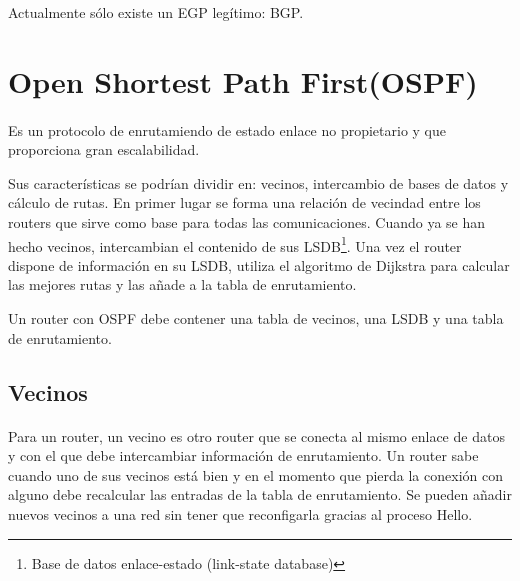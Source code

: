 \documentclass[a4paper,11pt]{article}
\begin{document}
Actualmente sólo existe un EGP legítimo: BGP.


\section{Open Shortest Path First(OSPF)}\label{sec:ospf}
\paragraph{  }
Es un protocolo de enrutamiendo de estado enlace no propietario y que proporciona gran escalabilidad.

Sus características se podrían dividir en: vecinos, intercambio de bases de datos y cálculo de rutas. En primer lugar se forma una relación de vecindad entre los routers que sirve como base para todas las comunicaciones. Cuando ya se han hecho vecinos, intercambian el contenido de sus LSDB\footnote{Base de datos enlace-estado (link-state database)}. Una vez el router dispone de información en su LSDB, utiliza el algoritmo de Dijkstra para calcular las mejores rutas y las añade a la tabla de enrutamiento.

Un router con OSPF debe contener una tabla de vecinos, una LSDB y una tabla de enrutamiento.

\subsection{Vecinos}
\paragraph{  }
Para un router, un vecino es otro router que se conecta al mismo enlace de datos y con el que debe intercambiar información de enrutamiento. Un router sabe cuando uno de sus vecinos está bien y en el momento que pierda la conexión con alguno debe recalcular las entradas de la tabla de enrutamiento. Se pueden añadir nuevos vecinos a una red sin tener que reconfigarla gracias al proceso Hello.
\end{document}

